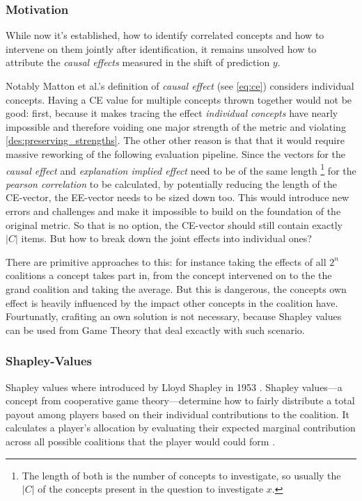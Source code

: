 \subsubsection{Motivation}
\label{sec:shapley_motivation}
While now it's established, how to identify correlated concepts and how to intervene on them jointly after identification, it remains unsolved how to attribute the \emph{causal effects} measured in the shift of prediction $y$.

Notably Matton et al.'s definition of \emph{causal effect} (see \ref{eq:ce}) considers individual concepts. Having a CE value for multiple concepts thrown together would not be good: first, because it makes tracing the effect \emph{individual concepts} have nearly impossible and therefore voiding one major strength of the metric and violating \ref{des:preserving_strengths}. The other other reason is that that it would require massive reworking of the following evaluation pipeline. Since the vectors for the \emph{causal effect} and \emph{explanation implied effect} need to be of the same length \footnote{The length of both is the number of concepts to investigate, so usually the $\lvert C \rvert$ of the concepts present in the question to investigate $x$.} for the \emph{pearson correlation} to be calculated, by potentially reducing the length of the CE-vector, the EE-vector needs to be sized down too. This would introduce new errors and challenges and make it impossible to build on the foundation of the original metric. So that is no option, the CE-vector should still contain exactly $\lvert C \rvert$ items. But how to break down the joint effects into individual ones?

There are primitive approaches to this: for instance taking the effects of all $2^n$ coalitions a concept takes part in, from the concept intervened on to the the grand coalition and taking the average. But this is dangerous, the concepts own effect is heavily influenced by the impact other concepts in the coalition have. Fourtunatly, crafiting an own solution is not necessary, because Shapley values can be used from Game Theory that deal excactly with such scenario.

\subsubsection{Shapley-Values}
Shapley values where introduced by Lloyd Shapley in 1953 \cite{shapley17ValueNPerson1953}. Shapley values—a concept from cooperative game theory—determine how to fairly distribute a total payout among players based on their individual contributions to the coalition. It calculates a player’s allocation by evaluating their expected marginal contribution across all possible coalitions that the player would could form \cite{shapley17ValueNPerson1953, mitchellSamplingPermutationsShapley2022, parcalabescuMeasuringFaithfulnessSelfconsistency2024}.

